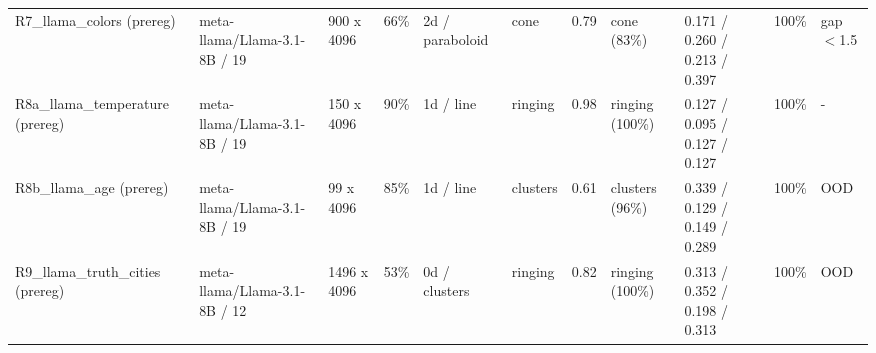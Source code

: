 \begin{tabular}{lllllllllll}
R7\_llama\_colors (prereg) & meta-llama/Llama-3.1-8B / 19 & 900 x 4096 & 66\% & 2d / paraboloid & cone & 0.79 & cone (83\%) & 0.171 / 0.260 / 0.213 / 0.397 & 100\% & gap$<$1.5 \\
R8a\_llama\_temperature (prereg) & meta-llama/Llama-3.1-8B / 19 & 150 x 4096 & 90\% & 1d / line & ringing & 0.98 & ringing (100\%) & 0.127 / 0.095 / 0.127 / 0.127 & 100\% & - \\
R8b\_llama\_age (prereg) & meta-llama/Llama-3.1-8B / 19 & 99 x 4096 & 85\% & 1d / line & clusters & 0.61 & clusters (96\%) & 0.339 / 0.129 / 0.149 / 0.289 & 100\% & OOD \\
R9\_llama\_truth\_cities (prereg) & meta-llama/Llama-3.1-8B / 12 & 1496 x 4096 & 53\% & 0d / clusters & ringing & 0.82 & ringing (100\%) & 0.313 / 0.352 / 0.198 / 0.313 & 100\% & OOD \\
\bottomrule
\end{tabular}
